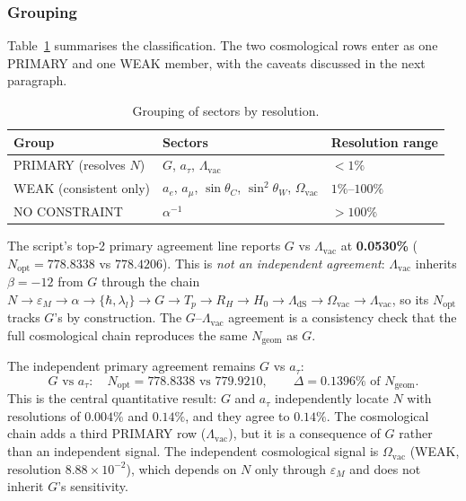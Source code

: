 \documentclass[10pt,a4paper]{article}
\begin{document}
\subsubsection{Grouping}

Table~\ref{tab:lock_in_grouping} summarises the classification. The two
cosmological rows enter as one PRIMARY and one WEAK member, with the
caveats discussed in the next paragraph.

\begin{table}[h!]
	\centering
	\small
	\caption{Grouping of sectors by resolution.}
	\label{tab:lock_in_grouping}
	\begin{tabular}{lll}
		\toprule
		\textbf{Group} & \textbf{Sectors} & \textbf{Resolution range} \\
		\midrule
		PRIMARY (resolves $N$)   & $G$, $a_\tau$, $\Lambda_{\text{vac}}$
		& $< 1\%$ \\
		WEAK (consistent only)   & $a_e$, $a_\mu$, $\sin\theta_C$,
		$\sin^2\theta_W$, $\Omega_{\text{vac}}$
		& $1\%$--$100\%$ \\
		NO CONSTRAINT            & $\alpha^{-1}$ & $> 100\%$ \\
		\bottomrule
	\end{tabular}
\end{table}

The script's top-2 primary agreement line reports $G$ vs
$\Lambda_{\text{vac}}$ at \textbf{0.0530\%} ($N_{\text{opt}} = 778.8338$
vs $778.4206$). This is \emph{not an independent agreement}:
$\Lambda_{\text{vac}}$ inherits $\beta = -12$ from $G$ through the chain
$N \to \varepsilon_M \to \alpha \to \{\hbar, \lambda_l\} \to G \to T_p \to
R_H \to H_0 \to \Lambda_{\text{dS}} \to \Omega_{\text{vac}} \to
\Lambda_{\text{vac}}$, so its $N_{\text{opt}}$ tracks $G$'s by
construction. The $G$--$\Lambda_{\text{vac}}$ agreement is a consistency
check that the full cosmological chain reproduces the same
$N_{\text{geom}}$ as $G$.

The independent primary agreement remains $G$ vs $a_\tau$:
\begin{equation}
	G \text{ vs } a_\tau: \quad
	N_{\text{opt}} = 778.8338 \text{ vs } 779.9210, \qquad
	\Delta = 0.1396\% \text{ of } N_{\text{geom}}.
\end{equation}
This is the central quantitative result: $G$ and $a_\tau$ independently
locate $N$ with resolutions of $0.004\%$ and $0.14\%$, and they agree to
$0.14\%$. The cosmological chain adds a third PRIMARY row
($\Lambda_{\text{vac}}$), but it is a consequence of $G$ rather than an
independent signal. The independent cosmological signal is
$\Omega_{\text{vac}}$ (WEAK, resolution $8.88 \times 10^{-2}$), which
depends on $N$ only through $\varepsilon_M$ and does not inherit $G$'s
sensitivity.
\end{document}
